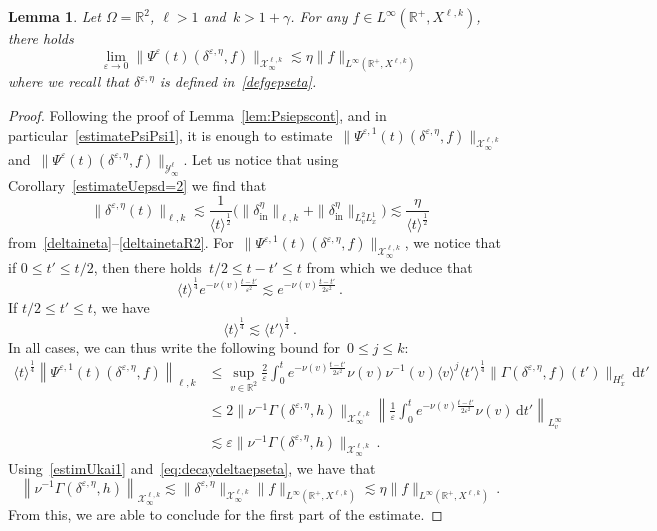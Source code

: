 \documentclass[11pt]{article}
\newtheorem{lemm}[theo]{Lemma}
\theoremstyle{definition}
\numberwithin{equation}{section}
\numberwithin{figure}{section}
\numberwithin{table}{section}
\newcommand*{\dd}{\mathrm{d}}
\newcommand*{\dt}{\dd t}
\newcommand*\R {\mathbb{R}}
\newcommand*\eps{{\varepsilon}}
\newcommand*\e{{\varepsilon}}
\DeclareMathOperator{\inn}{in}
\begin{document}
\begin{lemm}\label{lem:PsiepscontR2}
Let $\Omega = \R^2$, $\ell>1$ and~${k>1+\gamma}$. For any $f \in L^\infty(\R^+, X^{\ell,k})$, there holds
\[
\lim_{\eps \to 0} \|\Psi^\eps(t) (\delta^{\eps,\eta},f) \|_{\mathcal{X}^{\ell,k}_\infty} \lesssim \eta \|f\|_{L^\infty(\R^+, X^{\ell,k})}
\]
where we recall that $\delta^{\eps,\eta}$ is defined in~\eqref{defgepseta}.
\end{lemm}
\begin{proof}
Following the proof of Lemma~\ref{lem:Psiepscont}, and in particular~\eqref{estimatePsiPsi1}, it is enough to estimate~$\|\Psi^{\eps,1}(t)(\delta^{\eps,\eta},f) \|_{\mathcal{X}^{\ell,k}_\infty}$ and~$\|\Psi^{\eps}(t)(\delta^{\eps,\eta},f) \|_{\mathcal{Y}^{\ell}_\infty}$. Let us notice that using Corollary~\ref{estimateUepsd=2} we find that
\begin{equation}\label{eq:decaydeltaepseta}
\|\delta^{\eps,\eta}(t) \|_{\ell,k}\lesssim \frac{1}{\langle t \rangle^\frac12} \big(\|\delta^\eta_{\inn}\|_{\ell,k} + \|\delta^\eta_{\inn}\|_{L^2_vL^1_x} \big) \lesssim \frac{\eta}{\langle t \rangle^\frac12}
\end{equation}
from~\eqref{deltaineta}--\eqref{deltainetaR2}. For~$\|\Psi^{\eps,1}(t)(\delta^{\eps,\eta},f) \|_{\mathcal{X}^{\ell,k}_\infty}$, we notice that if $0 \le {t'} \le t/2$, then there holds~$t/2 \le t-{t'} \le t$ from which we deduce that
\[
\langle t \rangle^{\frac14} e^{-\nu(v)\frac{t-{t'}}{\e^2}} \lesssim e^{-\nu(v)\frac{t-{t'}}{2\e^2}}\,.
\]
If $t/2 \le {t'} \le t$, we have
\[
\langle t \rangle^{\frac14} \lesssim \langle t'\rangle^{\frac14} \,.
\]
In all cases, we can thus write the following bound for~$0\leq j \leq k$:
\begin{align*}
\langle t \rangle^{\frac14} \left\|\Psi^{\eps,1}(t)(\delta^{\eps,\eta},f) \right\|_{{\ell,k}}
&\le\sup_{v \in \R^2} \frac{2}{\e} \int_0^t e^{-\nu(v)\frac{t-{t'}}{2\e^2}} \nu(v) \nu^{-1}(v) \langle v \rangle^j \langle t'\rangle^{\frac14}\| \Gamma(\delta^{\eps,\eta},f) ({t'})\|_{H^\ell_x} \, \dt' \\
&\le 2\| \nu^{-1} \Gamma (\delta^{\eps,\eta},h) \|_{\mathcal{X}_\infty^{\ell,k} } \left\| \frac{1}{\e} \int_0^t e^{-\nu(v)\frac{t-{t'}}{2\e^2}} \nu(v) \, \dt' \right\|_{L^\infty_v} \\
&\lesssim \e \| \nu^{-1} \Gamma (\delta^{\eps,\eta},h) \|_{\mathcal{X}_\infty^{\ell,k} }\,.
\end{align*}
Using~\eqref{estimUkai1} and~\eqref{eq:decaydeltaepseta}, we have that
\[
\left\| \nu^{-1} \Gamma (\delta^{\eps,\eta},h) \right\|_{\mathcal{X}^{\ell,k}_\infty} \lesssim \|\delta^{\eps,\eta}\|_{\mathcal{X}^{\ell,k}_\infty} \|f\|_{L^\infty(\R^+, X^{\ell,k})} \lesssim \eta \|f\|_{L^\infty(\R^+, X^{\ell,k})}\,.
\]
From this, we are able to conclude for the first part of the estimate.


\end{proof}
\end{document}
